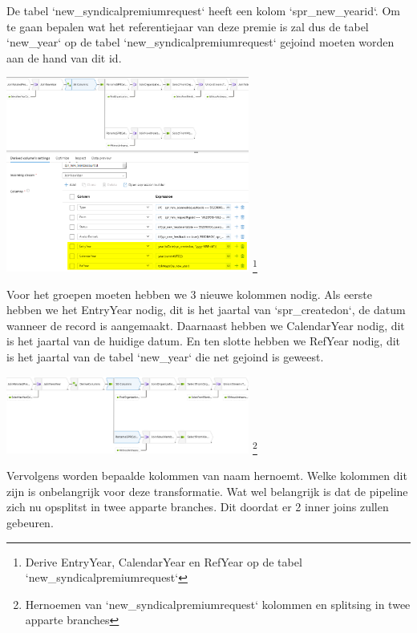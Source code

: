 De tabel `new\_syndicalpremiumrequest` heeft een kolom `spr\_new\_yearid`. Om te gaan bepalen wat het referentiejaar van deze premie is zal dus de tabel `new\_year` op de tabel `new\_syndicalpremiumrequest` gejoind moeten worden aan de hand van dit id.


\begin{center}
    \includegraphics[width=0.6\textwidth]{./graphics/adf/bepalen_groep_2.png}
    \footnote{Derive EntryYear, CalendarYear en RefYear op de tabel `new\_syndicalpremiumrequest`}
\end{center}

Voor het groepen moeten hebben we 3 nieuwe kolommen nodig. Als eerste hebben we het EntryYear nodig, dit is het jaartal van `spr\_createdon`, de datum wanneer de record is aangemaakt. Daarnaast hebben we CalendarYear nodig, dit is het jaartal van de huidige datum. En ten slotte hebben we RefYear nodig, dit is het jaartal van de tabel `new\_year` die net gejoind is geweest.

\begin{center}
    \includegraphics[width=0.6\textwidth]{./graphics/adf/bepalen_groep_3.png}
    \footnote{Hernoemen van `new\_syndicalpremiumrequest` kolommen en splitsing in twee apparte branches}
\end{center}

Vervolgens worden bepaalde kolommen van naam hernoemt. Welke kolommen dit zijn is onbelangrijk voor deze transformatie. Wat wel belangrijk is dat de pipeline zich nu opsplitst in twee apparte branches. Dit doordat er 2 inner joins zullen gebeuren.

